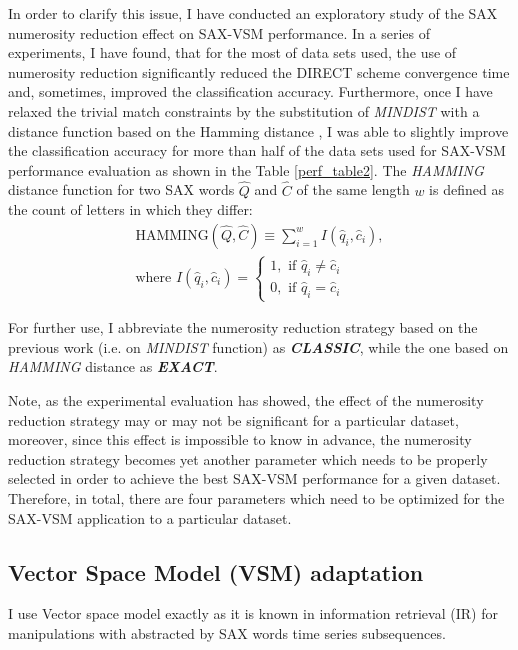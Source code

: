 In order to clarify this issue, I have conducted an exploratory study of the SAX numerosity reduction 
effect on SAX-VSM performance. In a series of experiments, I have found, that for the most of data sets used, the use of 
numerosity reduction significantly reduced the DIRECT scheme convergence time and, sometimes, improved the classification accuracy. 
Furthermore, once I have relaxed the trivial match constraints by the substitution of 
\textit{MINDIST} with a distance function based on the Hamming distance \cite{hamming}, 
I was able to slightly improve the classification accuracy for more than half of the data sets used for \mbox{SAX-VSM}
performance evaluation as shown in the Table \ref{perf_table2}. 
The \textit{HAMMING} distance function for two SAX words $\hat{Q}$ and $\hat{C}$ of the same length $w$ 
is defined as the count of letters in which they differ:
\begin{equation}
\label{eq:hamming}
\begin{split}
\text{HAMMING}(\widehat{Q},\widehat{C}) \equiv \sum_{i=1}^{w} I( \widehat{q}_{i}, \widehat{c}_{i} ), \\
\text{where } I( \widehat{q}_{i}, \widehat{c}_{i} ) = 
\begin{cases}
 1,\text{ if } \widehat{q}_{i} \neq \widehat{c}_{i} \\
 0,\text{ if } \widehat{q}_{i} = \widehat{c}_{i}
\end{cases}
\end{split}                                                      
\end{equation}

For further use, I abbreviate the numerosity reduction strategy based on the previous work (i.e. on \textit{MINDIST} 
function) as \textit{\textbf{CLASSIC}}, while the one based on \textit{HAMMING} distance as \textit{\textbf{EXACT}}.

Note, as the experimental evaluation has showed, the effect of the numerosity reduction strategy may or may not be significant 
for a particular dataset, moreover, since this effect is impossible to know in advance, the numerosity reduction strategy becomes 
yet another parameter which needs to be properly selected in order to achieve the best SAX-VSM performance for a given dataset. 
Therefore, in total, there are four parameters which need to be optimized for the SAX-VSM application to a particular dataset.

\subsection{Vector Space Model (VSM) adaptation}\label{vsm}
I use Vector space model exactly as it is known in information retrieval (IR) \cite{citeulike:300428} for 
manipulations with abstracted by SAX words time series subsequences. 

